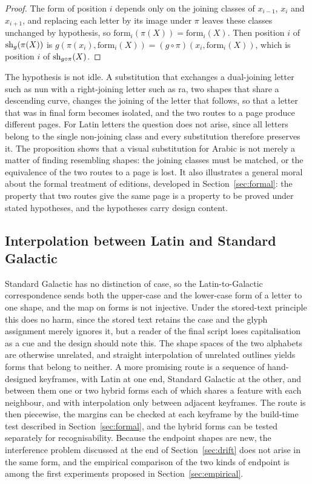 \begin{proof}
The form of position $i$ depends only on the joining classes of $x_{i-1}$, $x_i$ and $x_{i+1}$, and replacing each letter by its image under $\pi$ leaves these classes unchanged by hypothesis, so $\mathrm{form}_i(\pi(X))=\mathrm{form}_i(X)$. Then position $i$ of $\mathrm{sh}_g(\pi(X))$ is $g(\pi(x_i),\mathrm{form}_i(X))=(g\circ\pi)(x_i,\mathrm{form}_i(X))$, which is position $i$ of $\mathrm{sh}_{g\circ\pi}(X)$.
\end{proof}

The hypothesis is not idle. A substitution that exchanges a dual-joining letter such as nun with a right-joining letter such as ra, two shapes that share a descending curve, changes the joining of the letter that follows, so that a letter that was in final form becomes isolated, and the two routes to a page produce different pages. For Latin letters the question does not arise, since all letters belong to the single non-joining class and every substitution therefore preserves it. The proposition shows that a visual substitution for Arabic is not merely a matter of finding resembling shapes: the joining classes must be matched, or the equivalence of the two routes to a page is lost. It also illustrates a general moral about the formal treatment of editions, developed in Section~\ref{sec:formal}: the property that two routes give the same page is a property to be proved under stated hypotheses, and the hypotheses carry design content.

\subsection{Interpolation between Latin and Standard Galactic}

Standard Galactic has no distinction of case, so the Latin-to-Galactic correspondence sends both the upper-case and the lower-case form of a letter to one shape, and the map on forms is not injective. Under the stored-text principle this does no harm, since the stored text retains the case and the glyph assignment merely ignores it, but a reader of the final script loses capitalisation as a cue and the design should note this. The shape spaces of the two alphabets are otherwise unrelated, and straight interpolation of unrelated outlines yields forms that belong to neither. A more promising route is a sequence of hand-designed keyframes, with Latin at one end, Standard Galactic at the other, and between them one or two hybrid forms each of which shares a feature with each neighbour, and with interpolation only between adjacent keyframes. The route is then piecewise, the margins can be checked at each keyframe by the build-time test described in Section~\ref{sec:formal}, and the hybrid forms can be tested separately for recognisability. Because the endpoint shapes are new, the interference problem discussed at the end of Section~\ref{sec:drift} does not arise in the same form, and the empirical comparison of the two kinds of endpoint is among the first experiments proposed in Section~\ref{sec:empirical}.

